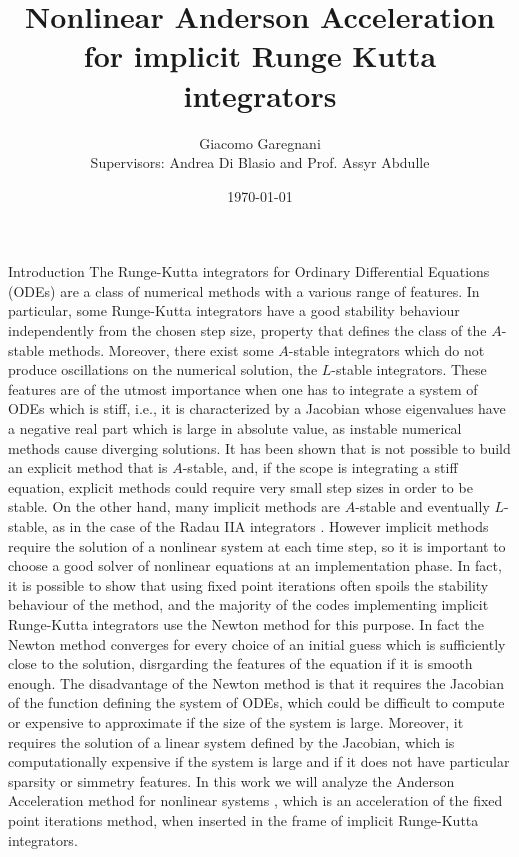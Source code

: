 \documentclass{article}
\title{\textbf{Nonlinear Anderson Acceleration for implicit Runge Kutta integrators}}
\author{Giacomo Garegnani \\ {Supervisors: Andrea Di Blasio and Prof. Assyr Abdulle}}
\date{\today}
\begin{document}
\maketitle

\begin{section}{Introduction}
The Runge-Kutta integrators for Ordinary Differential Equations (ODEs) are a class of numerical methods with a various range of features. In particular, some Runge-Kutta integrators have a good stability behaviour independently from the chosen step size, property that defines the class of the $A$-stable methods. Moreover, there exist some $A$-stable integrators which do not produce oscillations on the numerical solution, the $L$-stable integrators. These features are of the utmost importance when one has to integrate a system of ODEs which is stiff, i.e., it is characterized by a Jacobian whose eigenvalues have a negative real part which is large in absolute value, as instable numerical methods cause diverging solutions. It has been shown that is not possible to build an explicit method that is $A$-stable, and, if the scope is integrating a stiff equation, explicit methods could require very small step sizes in order to be stable. On the other hand, many implicit methods are $A$-stable and eventually $L$-stable, as in the case of the Radau IIA integrators \cite{HW}. However implicit methods require the solution of a nonlinear system at each time step, so it is important to choose a good solver of nonlinear equations at an implementation phase. In fact, it is possible to show that using fixed point iterations often spoils the stability behaviour of the method, and the majority of the codes implementing implicit Runge-Kutta integrators use the Newton method for this purpose. In fact the Newton method converges for every choice of an initial guess which is sufficiently close to the solution, disrgarding the features of the equation if it is smooth enough. The disadvantage of the Newton method is that it requires the Jacobian of the function defining the system of ODEs, which could be difficult to compute or expensive to approximate if the size of the system is large. Moreover, it requires the solution of a linear system defined by the Jacobian, which is computationally expensive if the system is large and if it does not have particular sparsity or simmetry features. In this work we will analyze the Anderson Acceleration method for nonlinear systems \cite{WALNI,SAAD}, which is an acceleration of the fixed point iterations method, when inserted in the frame of implicit Runge-Kutta integrators. \\

\end{section}
\end{document}
